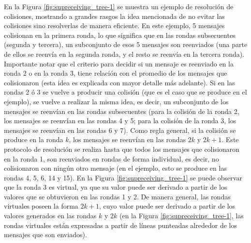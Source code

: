 En la Figura \ref{fig:supreceiving_tree-1} se muestra un ejemplo de resolución 
de colisiones, mostrando a grandes rasgos la idea mencionada de no evitar las 
colisiones sino resolverlas de manera eficiente. En este ejemplo, 5 mensajes 
colisionan en la primera ronda, lo que significa que en las rondas 
subsecuentes (segunda y tercera), un subconjunto de esos 5 mensajes son 
reenviados (una parte de ellos se reenvía en la segunda ronda, y el resto se 
reenvía en la tercera ronda). Importante notar que el criterio para decidir si 
un mensaje es reenviado en la ronda 2 o en la ronda 3, tiene relación con el 
promedio de los mensajes que colisionaron (esta idea es explicada con mayor 
detalle más adelante). Si en las rondas 2 ó 3 se vuelve a producir una 
colisión (que es el caso que se produce en el ejemplo), se vuelve a realizar 
la misma idea, es decir, un subconjunto de los mensajes se reenvían en las 
rondas subsecuentes (para la colisión de la ronda 2, los mensajes se reenvían 
en las rondas 4 y 5; para la colisión de la ronda 3, los mensajes se reenvían 
en las rondas 6 y 7). Como regla general, si la colisión se produce en la 
ronda $k$, los mensajes se reenvían en las rondas $2k$ y $2k + 1$. Este 
protocolo de resolución se realiza hasta que todos los mensajes que 
colisionaron en la ronda 1, son reenviados en rondas de forma individual, es 
decir, no colisionaron con ningún otro mensaje (en el ejemplo, esto se produce 
en las rondas 4, 5, 6, 14 y 15). En la Figura \ref{fig:supreceiving_tree-1} se 
puede observar que la ronda 3 es 
virtual, ya que su valor puede ser derivado a partir de los valores que se 
obtuvieron en las rondas 1 y 2. De manera general, las rondas virtuales poseen 
la forma $2k + 1$, cuyo valor puede ser derivado a partir de los valores 
generados en las rondas $k$ y $2k$ (en la Figura 
\ref{fig:supreceiving_tree-1}, las rondas virtuales están 
expresadas a partir de líneas punteadas alrededor de los mensajes que son 
enviados).

